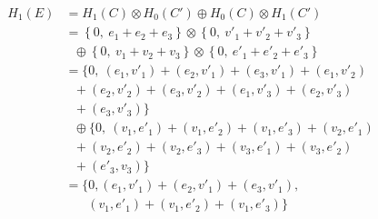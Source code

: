 \documentclass[a4paper,20pt]{ltjsarticle}
\begin{document}
\large
\begin{align*}
    H_1(E)&=H_1(C)\otimes H_0(C')\oplus H_0(C)\otimes H_1(C')\\
    &=\left\{0,\ e_1+e_2+e_3\right\}\otimes\left\{0,\ v'_1+v'_2+v'_3\right\}\\
    &\ \ \ \oplus\left\{0,\ v_1+v_2+v_3\right\}\otimes\left\{0,\ e'_1+e'_2+e'_3\right\}\\
    &=\{0,\ (e_1,v'_1)+(e_2,v'_1)+(e_3,v'_1)+(e_1,v'_2)\\
    &\ \ \ +(e_2,v'_2)+(e_3,v'_2)+(e_1,v'_3)+(e_2,v'_3)\\
    &\ \ \ +(e_3,v'_3)\}\\
    &\ \ \ \oplus\{0,\ (v_1,e'_1)+(v_1,e'_2)+(v_1,e'_3)+(v_2,e'_1)\\
    &\ \ \ +(v_2,e'_2)+(v_2,e'_3)+(v_3,e'_1)+(v_3,e'_2)\\
    &\ \ \ +(e'_3,v_3)\}\\
    &=\{0, (e_1,v'_1)+(e_2,v'_1)+(e_3,v'_1),\\
    &\ \ \ \ \ \ \ \ (v_1,e'_1)+(v_1,e'_2)+(v_1,e'_3)\}
\end{align*}
\end{document}
